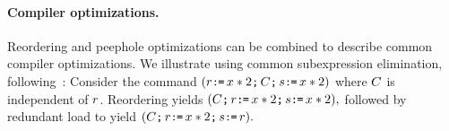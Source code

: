 
\paragraph*{Compiler optimizations.} Reordering and peephole optimizations
can be combined to describe common compiler optimizations.  We illustrate
using common subexpression elimination,
following~\citet{Dolan:2018:BDR:3192366.3192421}:
Consider the command 
\begin{math}
  (r \texttt{:}\mkern-1mu\texttt{=}\, x *2  \texttt{;}\,\allowbreak C \texttt{;}\,\allowbreak s \texttt{:}\mkern-1mu\texttt{=}\, x * 2)
\end{math}
where $C$ is independent of $r$.  Reordering yields
\begin{math}
  (C \texttt{;}\,\allowbreak r \texttt{:}\mkern-1mu\texttt{=}\, x *2  \texttt{;}\,\allowbreak  s \texttt{:}\mkern-1mu\texttt{=}\, x * 2),
\end{math}
followed by redundant load to yield
\begin{math}
  (C \texttt{;}\,\allowbreak r \texttt{:}\mkern-1mu\texttt{=}\, x * 2 \texttt{;}\,\allowbreak  s \texttt{:}\mkern-1mu\texttt{=}\, r).
\end{math}

